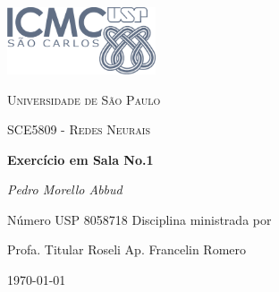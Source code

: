 \documentclass[11pt,a4paper]{report}
\begin{document}
\begin{titlepage}
\centering
\includegraphics[width=0.33\textwidth]{usp}\par\vspace{1cm}
{\scshape\LARGE Universidade de São Paulo\par}
  \vspace{1cm}
  {\scshape\Large SCE5809 - Redes Neurais\par}
  \vspace{1.5cm}
  {\huge\bfseries Exercício em Sala No.1\par}
  \vspace{2cm}
  {\Large\itshape Pedro Morello Abbud \par}
  \vspace{1cm}
  Número USP 8058718
  \vfill
  Disciplina ministrada por\par
 Profa. Titular Roseli Ap. Francelin Romero 

\vfill 
{\large \today\par}
\end{titlepage}
\end{document}
